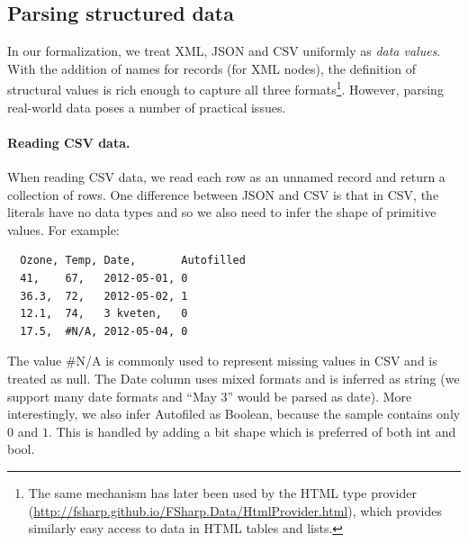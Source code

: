 \documentclass[10pt]{sigplanconf}
\newcommand{\kvd}[1]{\textnormal{\textcolor{kvdclr}{\sffamily #1}}}
\newcommand{\ident}[1]{\textnormal{\sffamily #1}}
\begin{document}

\subsection{Parsing structured data}
\label{sec:impl-parsing}

In our formalization, we treat XML, JSON and CSV uniformly as \emph{data values}. With the addition of 
names for records (for XML nodes), the definition of structural values is rich enough to capture all 
three formats\footnote{The same mechanism has later been used by the HTML type provider 
(\url{http://fsharp.github.io/FSharp.Data/HtmlProvider.html}), which provides similarly easy 
access to data in HTML tables and lists.}. However, parsing real-world data poses a number of practical issues.

\paragraph{Reading CSV data.}
When reading CSV data, we read each row as an unnamed record and return a collection of rows.
One difference between JSON and CSV is that in CSV, the literals have no data types and so 
we also need to infer the shape of primitive values. For example:
%
{\small{
\begin{verbatim}
  Ozone, Temp, Date,       Autofilled
  41,    67,   2012-05-01, 0
  36.3,  72,   2012-05-02, 1
  12.1,  74,   3 kveten,   0
  17.5,  #N/A, 2012-05-04, 0
\end{verbatim}
}}
%
\noindent
The value {\small\ttfamily \#N/A} is commonly used to represent missing values in CSV and is treated
as \kvd{null}. The \ident{Date} column uses mixed formats and is inferred as \ident{string} 
(we support many date formats and ``May 3'' would be parsed as date). More interestingly,
we also infer \ident{Autofiled} as Boolean, because the sample contains only $0$ and $1$.
This is handled by adding a \ident{bit} shape which is preferred of both \ident{int} and \ident{bool}.
\end{document}
